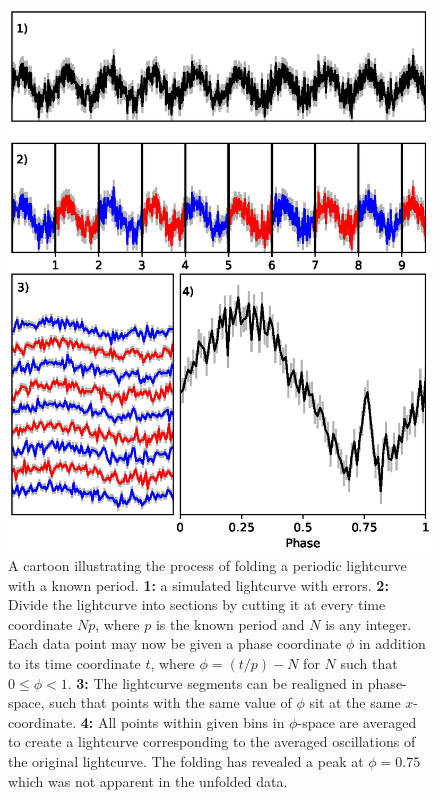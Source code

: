 \begin{figure}
    \includegraphics[width=\columnwidth, trim = 0mm 20mm 0mm 28mm]{images/folding.eps}
    \captionsetup{singlelinecheck=off}
    \caption{A cartoon illustrating the process of folding a periodic lightcurve with a known period.  \textbf{1:} a simulated lightcurve with errors.  \textbf{2:} Divide the lightcurve into sections by cutting it at every time coordinate $Np$, where $p$ is the known period and $N$ is any integer.  Each data point may now be given a phase coordinate $\phi$ in addition to its time coordinate $t$, where $\phi=(t/p)-N$ for $N$ such that $0\leq\phi<1$.  \textbf{3:} The lightcurve segments can be realigned in phase-space, such that points with the same value of $\phi$ sit at the same $x$-coordinate.  \textbf{4:} All points within given bins in $\phi$-space are averaged to create a lightcurve corresponding to the averaged oscillations of the original lightcurve.  The folding has revealed a peak at $\phi=0.75$ which was not apparent in the unfolded data.}
   \label{fig:Folding}
\end{figure}

